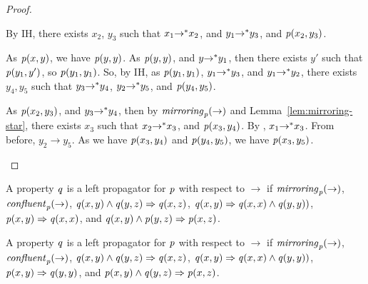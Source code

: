 \documentclass[numbers,10pt,preprint\ifanon ,nocopyrightspace\fi]{sigplanconf}
\begin{document}
\begin{proof}
\begin{case}[\TransitivityRule{}]
    By IH, there exists $x_2$, $y_3$ such that $x_1 {\rightarrow}^* x_2$, and
    $y_1 {\rightarrow}^* y_3$, and $\mathit{p}(x_2,y_3)$.

    As $\mathit{p}(x,y)$, we have $\mathit{p}(y,y)$.  As $\mathit{p}(y,y)$, and $y
    {\rightarrow}^* y_1$, then there exists $y'$ such that
    $\mathit{p}(y_1,y')$, so $\mathit{p}(y_1,y_1)$.
    So, by IH, as $\mathit{p}(y_1,y_1)$, $y_1 {\rightarrow}^* y_3$, and
    $y_1 {\rightarrow}^* y_2$, there exists $y_4,y_5$ such that
    $y_3 {\rightarrow}^* y_4$,
    $y_2 {\rightarrow}^* y_5$, and $\mathit{p}(y_4,y_5)$.

    As $\mathit{p}(x_2,y_3)$, and $y_3 {\rightarrow}^* y_4$, then by
    $\mathit{mirroring}_{\mathit{p}}(\rightarrow)$ and
    Lemma~\ref{lem:mirroring-star}, there exists $x_3$ such that
    $x_2 {\rightarrow}^* x_3$, and $\mathit{p}(x_3,y_4)$.
    By \TransitivityRule{}, $x_1 {\rightarrow}^* x_3$.
    From before, $y_2 \rightarrow y_5$.
    As we have $\mathit{p}(x_3,y_4)$ and $\mathit{p}(y_4,y_5)$, we have
    $\mathit{p}(x_3,y_5)$.
  \end{case}
\end{proof}

\begin{definition}
  A property $\mathit{q}$ is a left propagator for $\mathit{p}$ with respect to
  $\rightarrow$ if
  $\mathit{mirroring}_{\mathit{p}}(\rightarrow)$,
  $\mathit{confluent}_{\mathit{p}}(\rightarrow)$,
  $\mathit{q}(x,y) \wedge \mathit{q}(y,z) \Rightarrow \mathit{q}(x,z)$,
  $\mathit{q}(x,y) \Rightarrow \mathit{q}(x,x) \wedge
  \mathit{q}(y,y))$,
  $\mathit{p}(x,y) \Rightarrow \mathit{q}(x,x)$, and
  $\mathit{q}(x,y) \wedge \mathit{p}(y,z) \Rightarrow \mathit{p}(x,z)$.
\end{definition}

\begin{definition}
  A property $\mathit{q}$ is a left propagator for $\mathit{p}$ with respect to
  $\rightarrow$ if
  $\mathit{mirroring}_{\mathit{p}}(\rightarrow)$,
  $\mathit{confluent}_{\mathit{p}}(\rightarrow)$,
  $\mathit{q}(x,y) \wedge \mathit{q}(y,z) \Rightarrow \mathit{q}(x,z)$,
  $\mathit{q}(x,y) \Rightarrow \mathit{q}(x,x) \wedge
  \mathit{q}(y,y))$,
  $\mathit{p}(x,y) \Rightarrow \mathit{q}(y,y)$, and
  $\mathit{p}(x,y) \wedge \mathit{q}(y,z) \Rightarrow \mathit{p}(x,z)$.
\end{definition}
\end{document}
